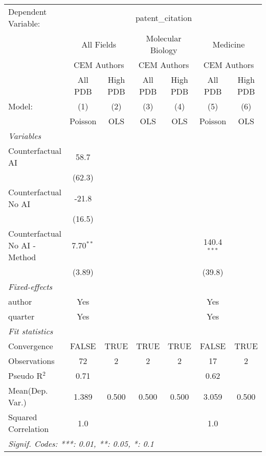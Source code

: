 \begingroup
\centering
\begin{tabular}{lcccccc}
   \tabularnewline \midrule \midrule
   Dependent Variable: & \multicolumn{6}{c}{patent\_citation}\\
 & \multicolumn{2}{c}{All Fields} & \multicolumn{2}{c}{Molecular Biology} & \multicolumn{2}{c}{Medicine} \\
\cmidrule(lr){2-3} \cmidrule(lr){4-5} \cmidrule(lr){6-7}
 & \multicolumn{2}{c}{CEM Authors} & \multicolumn{2}{c}{CEM Authors} & \multicolumn{2}{c}{CEM Authors} \\
\cmidrule(lr){2-3} \cmidrule(lr){4-5} \cmidrule(lr){6-7}
 & \multicolumn{1}{c}{All PDB} & \multicolumn{1}{c}{High PDB} & \multicolumn{1}{c}{All PDB} & \multicolumn{1}{c}{High PDB} & \multicolumn{1}{c}{All PDB} & \multicolumn{1}{c}{High PDB} \\
\cmidrule(lr){2-2} \cmidrule(lr){3-3} \cmidrule(lr){4-4} \cmidrule(lr){5-5} \cmidrule(lr){6-6} \cmidrule(lr){7-7}
   Model:                        & (1)         & (2)  & (3)  & (4)  & (5)           & (6)\\  
                                 &  Poisson    & OLS  & OLS  & OLS  & Poisson       & OLS\\  
   \midrule
   \emph{Variables}\\
   Counterfactual AI             & 58.7        &      &      &      &               &   \\   
                                 & (62.3)      &      &      &      &               &   \\   
   Counterfactual No AI          & -21.8       &      &      &      &               &   \\   
                                 & (16.5)      &      &      &      &               &   \\   
   Counterfactual No AI - Method & 7.70$^{**}$ &      &      &      & 140.4$^{***}$ &   \\   
                                 & (3.89)      &      &      &      & (39.8)        &   \\   
   \midrule
   \emph{Fixed-effects}\\
   author                        & Yes         &      &      &      & Yes           & \\  
   quarter                       & Yes         &      &      &      & Yes           & \\  
   \midrule
   \emph{Fit statistics}\\
   Convergence                   &FALSE        & TRUE & TRUE & TRUE & FALSE         & TRUE\\  
   Observations                  & 72          & 2    & 2    & 2    & 17            & 2\\  
   Pseudo R$^2$                  & 0.71        &      &      &      & 0.62          & \\  
Mean(Dep. Var.) & 1.389 & 0.500 & 0.500 & 0.500 & 3.059 & 0.500 \\
   Squared Correlation           & 1.0         &      &      &      & 1.0           & \\  
   \midrule \midrule
   \multicolumn{7}{l}{\emph{Signif. Codes: ***: 0.01, **: 0.05, *: 0.1}}\\
\end{tabular}
\par\endgroup
